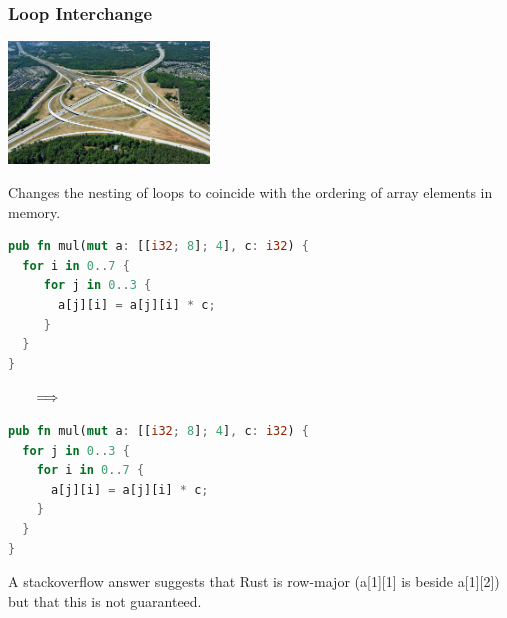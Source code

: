 \begin{frame}[fragile]
\frametitle{Loop Interchange}

\begin{center}
	\includegraphics[width=0.4\textwidth]{images/loop-interchange.jpg}
\end{center}

Changes the nesting of loops to
coincide with the ordering of array elements in memory. 


\begin{center}
\vspace*{-1em}
\begin{minipage}{.39\textwidth}
  \begin{lstlisting}[language=Rust]
pub fn mul(mut a: [[i32; 8]; 4], c: i32) {
  for i in 0..7 {
     for j in 0..3 {
       a[j][i] = a[j][i] * c;
     }
  }
}
  \end{lstlisting}
  \end{minipage} $\hspace*{2em} \Longrightarrow \hspace*{2em}$ \begin{minipage}{.4\textwidth}
  \begin{lstlisting}[language=Rust]
pub fn mul(mut a: [[i32; 8]; 4], c: i32) {
  for j in 0..3 {
    for i in 0..7 {
      a[j][i] = a[j][i] * c;
    }
  }
}
  \end{lstlisting}
  \end{minipage}
  \end{center}
  A stackoverflow answer suggests that Rust is row-major
  (a[1][1] is beside a[1][2]) but that this is not
  guaranteed.
  
\end{frame}

